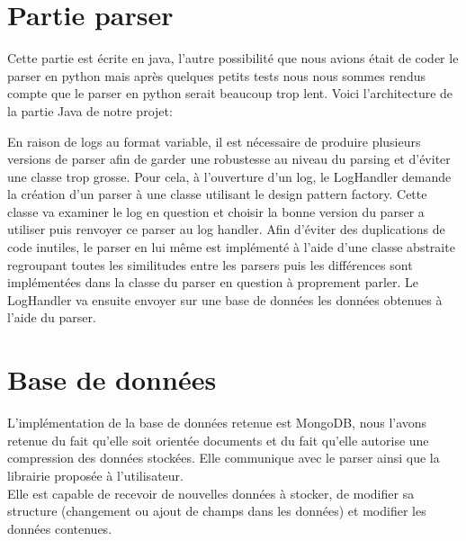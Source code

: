 \section{Partie parser}
Cette partie est écrite en java, l'autre possibilité que nous avions était de coder le parser en python mais après quelques petits tests nous nous sommes rendus compte que le parser en python serait beaucoup trop lent. Voici l'architecture de la partie Java de notre projet:

En raison de logs au format variable, il est nécessaire de produire plusieurs versions de parser afin de garder une robustesse au niveau du parsing et d'éviter une classe trop grosse. Pour cela, à l'ouverture d'un log, le LogHandler demande la création d'un parser à une classe utilisant le design pattern factory. Cette classe va examiner le log en question et choisir la bonne version du parser a utiliser puis renvoyer ce parser au log handler. Afin d'éviter des duplications de code inutiles, le parser en lui même est implémenté à l'aide d'une classe abstraite regroupant toutes les similitudes entre les parsers puis les différences sont implémentées dans la classe du parser en question à proprement parler. Le LogHandler va ensuite envoyer sur une base de données les données obtenues à l'aide du parser.

\section{Base de données}
L'implémentation de la base de données retenue est MongoDB, nous l'avons retenue du fait qu'elle soit orientée documents et du fait qu'elle autorise une compression des données stockées. Elle communique avec le parser ainsi que la librairie proposée à l'utilisateur.\\
Elle est capable de recevoir de nouvelles données à stocker, de modifier sa structure (changement ou ajout de champs dans les données) et modifier les données contenues.

